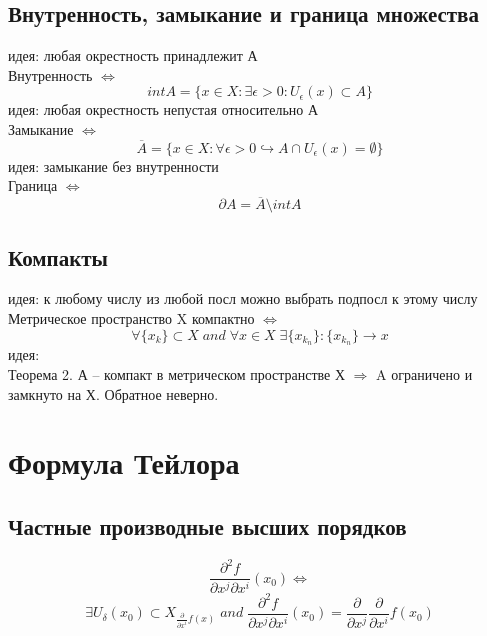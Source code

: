 \documentclass{article}
\begin{document}
\subsection{Внутренность, замыкание и граница множества}
идея: любая окрестность принадлежит А \\
Внутренность $\Leftrightarrow$
\begin{equation*}
    int A = \{ x \in X: \exists \epsilon > 0: U_{\epsilon} (x) \subset A \}
\end{equation*}
идея: любая окрестность непустая относительно А \\
Замыкание $\Leftrightarrow$
\begin{equation*}
    \overline{A} = \{ x \in X: \forall \epsilon>0 \hookrightarrow A \cap U_\epsilon (x) = \emptyset \}
\end{equation*}
идея: замыкание без внутренности \\
Граница $\Leftrightarrow$
\begin{equation*}
    \partial A = \overline{A} \setminus int A
\end{equation*}
\subsection{Компакты}
идея: к любому числу из любой посл можно выбрать подпосл к этому числу \\
Метрическое пространство X компактно $\Leftrightarrow$
\begin{equation*}
    \forall \{ x_k \} \subset X \; and \; \forall x \in X \; \exists \{ x_{k_n} \}: \{ x_{k_n} \} \rightarrow x
\end{equation*}
идея: \\
Теорема 2. А -- компакт в метрическом пространстве Х $\Rightarrow$ A ограничено и замкнуто на Х. Обратное неверно.


\section{Формула Тейлора}
\subsection{Частные производные высших порядков}
\begin{equation*}
    \frac{\partial^2 f}{\partial x^j \partial x^i}(x_0) \Leftrightarrow
\end{equation*}
\begin{equation*}
    \exists U_\delta (x_0) \subset X_{\frac{\partial}{\partial x^i} f(x)} \; and \; \frac{\partial^2 f}{\partial x^j \partial x^i}(x_0) = \frac{\partial}{\partial x^j} \frac{\partial}{\partial x^i} f(x_0)
\end{equation*}
\end{document}
